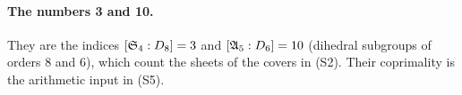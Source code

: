 \paragraph{The numbers 3 and 10.}
They are the indices $[\mathfrak S_4:D_8]=3$ and $[\mathfrak A_5:D_6]=10$ (dihedral subgroups of orders $8$ and $6$), which count the sheets of the covers in (S2). Their coprimality is the arithmetic input in (S5).
